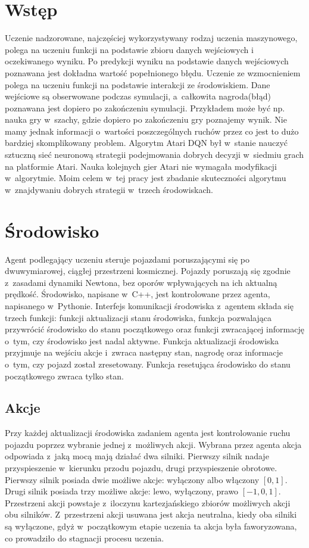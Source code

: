 \documentclass[12pt, oneside]{article}
\begin{document}
\section{Wstęp}
Uczenie nadzorowane, najczęściej wykorzystywany rodzaj uczenia maszynowego, polega na uczeniu funkcji na podstawie zbioru danych wejściowych i oczekiwanego wyniku. Po predykcji wyniku na podstawie danych wejściowych poznawana jest dokładna wartość popełnionego błędu.  
Uczenie ze wzmocnieniem polega na uczeniu funkcji na podstawie interakcji ze środowiskiem. Dane wejściowe są obserwowane podczas symulacji, a~całkowita nagroda(błąd) poznawana jest dopiero po zakończeniu symulacji.
Przykładem może być np. nauka gry w~szachy, gdzie dopiero po zakończeniu gry poznajemy  wynik. Nie mamy jednak informacji o~wartości poszczególnych ruchów przez co jest to dużo bardziej skomplikowany problem. 
Algorytm Atari DQN\cite{mnih2013playing} był w~stanie nauczyć sztuczną sieć neuronową strategii podejmowania dobrych decyzji w~siedmiu grach na platformie Atari. Nauka kolejnych gier Atari nie wymagała modyfikacji w~algorytmie. Moim celem w~tej pracy jest zbadanie skuteczności algorytmu w~znajdywaniu dobrych strategii w~trzech środowiskach.

\section{Środowisko}
Agent podlegający uczeniu steruje pojazdami poruszającymi się po dwuwymiarowej, ciągłej przestrzeni kosmicznej. 
Pojazdy poruszają się zgodnie z~zasadami dynamiki Newtona, bez oporów wpływających na ich aktualną prędkość. 
Środowisko, napisane w~C++, jest kontrolowane przez agenta, napisanego w~Pythonie. 
Interfejs komunikacji środowiska z~agentem składa się trzech funkcji: funkcji aktualizacji stanu środowiska, funkcja pozwalająca przywrócić środowisko do stanu początkowego oraz funkcji zwracającej informację o~tym, czy środowisko jest nadal aktywne. Funkcja aktualizacji środowiska przyjmuje na wejściu akcje i~zwraca następny stan, nagrodę oraz informacje o~tym, czy pojazd został zresetowany. Funkcja resetująca środowisko do stanu początkowego zwraca tylko stan.

\subsection{Akcje}
Przy każdej aktualizacji środowiska zadaniem agenta jest kontrolowanie ruchu pojazdu poprzez wybranie jednej z~możliwych akcji. Wybrana przez agenta akcja odpowiada z~jaką mocą mają działać dwa silniki. Pierwszy silnik nadaje przyspieszenie w~kierunku przodu pojazdu, drugi przyspieszenie obrotowe. 
Pierwszy silnik posiada dwie możliwe akcje: wyłączony albo włączony $[0,1]$. 
Drugi silnik posiada trzy możliwe akcje: lewo, wyłączony, prawo $[-1,0,1]$. 
Przestrzeni akcji powstaje z~iloczynu kartezjańskiego zbiorów możliwych akcji obu silników. Z~przestrzeni akcji usuwana jest akcja neutralna, kiedy oba silniki są wyłączone, gdyż w~początkowym etapie uczenia ta akcja była faworyzowana, co prowadziło do stagnacji procesu uczenia. 
\end{document}
